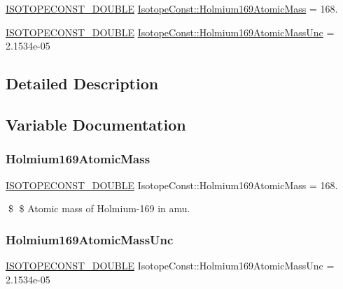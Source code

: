 \begin{DoxyCompactItemize}
\item 
\mbox{\hyperlink{group___isotope_const-_macros_ga8f45a7272ce02c0b4c65c44636ed719a}{I\+S\+O\+T\+O\+P\+E\+C\+O\+N\+S\+T\+\_\+\+D\+O\+U\+B\+LE}} \mbox{\hyperlink{group___isotope_const-_holmium-_ho169_ga2fd5622db12d61591fb82e2112e9cd33}{Isotope\+Const\+::\+Holmium169\+Atomic\+Mass}} = 168.
\item 
\mbox{\hyperlink{group___isotope_const-_macros_ga8f45a7272ce02c0b4c65c44636ed719a}{I\+S\+O\+T\+O\+P\+E\+C\+O\+N\+S\+T\+\_\+\+D\+O\+U\+B\+LE}} \mbox{\hyperlink{group___isotope_const-_holmium-_ho169_ga7db71a6e87ea09e00a3364beee954cce}{Isotope\+Const\+::\+Holmium169\+Atomic\+Mass\+Unc}} = 2.\+1534e-\/05
\end{DoxyCompactItemize}


\subsection{Detailed Description}


\subsection{Variable Documentation}
\mbox{\label{group___isotope_const-_holmium-_ho169_ga2fd5622db12d61591fb82e2112e9cd33}} 
\subsubsection{\texorpdfstring{Holmium169\+Atomic\+Mass}{Holmium169AtomicMass}}
{\footnotesize\ttfamily \mbox{\hyperlink{group___isotope_const-_macros_ga8f45a7272ce02c0b4c65c44636ed719a}{I\+S\+O\+T\+O\+P\+E\+C\+O\+N\+S\+T\+\_\+\+D\+O\+U\+B\+LE}} Isotope\+Const\+::\+Holmium169\+Atomic\+Mass = 168.}

\$ \$ Atomic mass of Holmium-\/169 in amu. \mbox{\label{group___isotope_const-_holmium-_ho169_ga7db71a6e87ea09e00a3364beee954cce}} 
\subsubsection{\texorpdfstring{Holmium169\+Atomic\+Mass\+Unc}{Holmium169AtomicMassUnc}}
{\footnotesize\ttfamily \mbox{\hyperlink{group___isotope_const-_macros_ga8f45a7272ce02c0b4c65c44636ed719a}{I\+S\+O\+T\+O\+P\+E\+C\+O\+N\+S\+T\+\_\+\+D\+O\+U\+B\+LE}} Isotope\+Const\+::\+Holmium169\+Atomic\+Mass\+Unc = 2.\+1534e-\/05}

